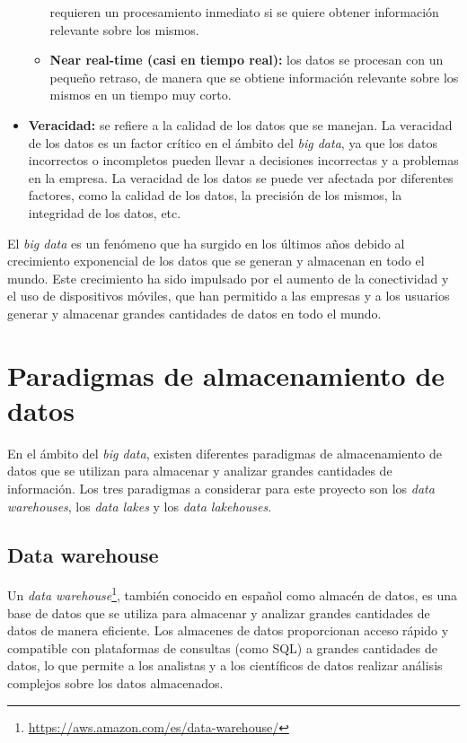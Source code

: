 \begin{itemize}
\begin{itemize}
				requieren un procesamiento inmediato si se quiere obtener
				información relevante sobre los mismos.
			\item \textbf{Near real-time (casi en tiempo real):} los datos se
				procesan con un pequeño retraso, de manera que se obtiene
				información relevante sobre los mismos en un tiempo muy corto.
		\end{itemize}
	\item \textbf{Veracidad:} se refiere a la calidad de los datos que se manejan.
		La veracidad de los datos es un factor crítico en el ámbito del \textit{big
		data}, ya que los datos incorrectos o incompletos pueden llevar a
		decisiones incorrectas y a problemas en la empresa. La veracidad de los
		datos se puede ver afectada por diferentes factores, como la calidad de
		los datos, la precisión de los mismos, la integridad de los datos, etc.
\end{itemize}

El \textit{big data} es un fenómeno que ha surgido en los últimos años debido al
crecimiento exponencial de los datos que se generan y almacenan en todo el
mundo. Este crecimiento ha sido impulsado por el aumento de la conectividad y el
uso de dispositivos móviles, que han permitido a las empresas y a los usuarios
generar y almacenar grandes cantidades de datos en todo el mundo.

\newpage{}
\section{Paradigmas de almacenamiento de datos}\label{sec:paradigmas}
En el ámbito del \textit{big data}, existen diferentes paradigmas de
almacenamiento de datos que se utilizan para almacenar y analizar grandes
cantidades de información. Los tres paradigmas a considerar para este proyecto
son los \textit{data warehouses}, los \textit{data lakes} y los
\textit{data lakehouses}.

\subsection{Data warehouse}\label{sec:warehouse}
Un \textit{data warehouse}\footnote{
	\url{https://aws.amazon.com/es/data-warehouse/}
}, también conocido en español como almacén de datos, es una base de datos que
se utiliza para almacenar y analizar grandes cantidades de datos de manera
eficiente. Los almacenes de datos proporcionan acceso rápido y compatible con
plataformas de consultas (como SQL) a grandes cantidades de datos, lo que
permite a los analistas y a los científicos de datos realizar análisis complejos
sobre los datos almacenados.

